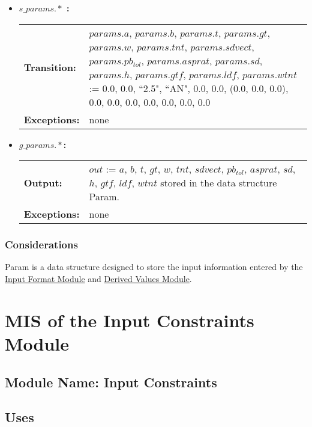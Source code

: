 \documentclass[12pt]{article}
\newcommand{\InputFormat}{\hyperref[SecInF]{Input Format Module}}
\newcommand{\DerivedVal}{\hyperref[SecDeV]{Derived Values Module}}
\begin{document}
\begin{itemize}
\item\textbf{$s\_params.\ast$ :} \\ \newline
\begin{tabular}{l p{}}
\textbf{Transition:} & $params.a$, $params.b$, $params.t$, $params.gt$, $params.w$,
$params.tnt$, $params.sdvect$, $params.pb_{tol}$, $params.asprat$, $params.sd$,
$params.h$, $params.gtf$, $params.ldf$, $params.wtnt$ := 0.0, 0.0, ``2.5", ``AN", 0.0, 0.0, (0.0, 0.0, 0.0),
0.0, 0.0, 0.0, 0.0, 0.0, 0.0, 0.0 \\
\textbf{Exceptions:} & none \\
\end{tabular}

\item\textbf{$g\_params.\ast$:} \\ \newline
\begin{tabular}{l p{}}
\textbf{Output:} & $out$ := $a$, $b$, $t$, $gt$, $w$, $tnt$, $sdvect$, $pb_{tol}$, $asprat$, 
$sd$, $h$, $gtf$, $ldf$, $wtnt$ stored in the data structure Param.\\
\textbf{Exceptions:} & none\\
\end{tabular}
\end{itemize}

\subsubsection{Considerations}
Param is a data structure designed to store the input information entered by 
the \InputFormat{} and \DerivedVal. 


\section{MIS of the Input Constraints Module} \label{SecInC}

\subsection{Module Name: Input Constraints}

\subsection{Uses}
\end{document}

